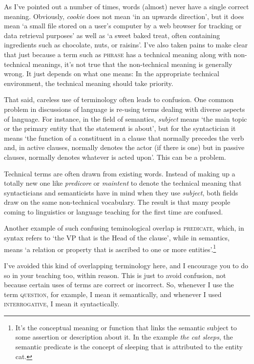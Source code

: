 \begin{tcolorbox}[title=Terminological hygiene, colback=white, parbox]\label{box:terminology-hygiene}
\setlength{\parindent}{1.5em}
    \noindent As I've pointed out a number of times, words (almost) never have a single correct meaning. Obviously, \textit{cookie} does not mean `in an upwards direction', but it does mean `a small file stored on a user's computer by a web browser for tracking or data retrieval purposes' as well as `a sweet baked treat, often containing ingredients such as chocolate, nuts, or raisins'. I've also taken pains to make clear that just because a term such as \textsc{phrase} has a technical meaning along with non-technical meanings, it's not true that the non-technical meaning is generally wrong. It just depends on what one means: In the appropriate technical environment, the technical meaning should take priority.
    
    That said, careless use of terminology often leads to confusion. One common problem in discussions of language is re-using terms dealing with diverse aspects of language. For instance, in the field of semantics, \textit{subject} means `the main topic or the primary entity that the statement is about', but for the syntactician it means `the function of a constituent in a clause that normally precedes the verb and, in active clauses, normally denotes the actor (if there is one) but in passive clauses, normally denotes whatever is acted upon'. This can be a problem.
    
    Technical terms are often drawn from existing words. Instead of making up a totally new one like \textit{predicore} or \textit{maintent} to denote the technical meaning that syntacticians and semanticists have in mind when they use \textit{subject}, both fields draw on the same non-technical vocabulary. The result is that many people coming to linguistics or language teaching for the first time are confused.
    
    Another example of such confusing teminological overlap is \textsc{predicate}, which, in syntax refers to `the VP that is the \textsf{Head} of the clause', while in semantics, means `a relation or property that is ascribed to one or more entities'.\footnote{It's the conceptual meaning or function that links the semantic subject to some assertion or description about it. In the example \textit{the cat sleeps}, the semantic predicate is the concept of sleeping that is attributed to the entity cat.}

    I've avoided this kind of overlapping terminology here, and I encourage you to do so in your teaching too, within reason. This is just to avoid confusion, not because certain uses of terms are correct or incorrect. So, whenever I use the term \textsc{question}, for example, I mean it semantically, and whenever I used \textsc{interrogative}, I mean it syntactically.
\end{tcolorbox}

